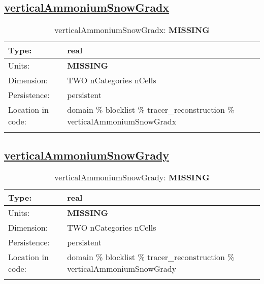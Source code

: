 \subsection[verticalAmmoniumSnowGradx]{\hyperref[sec:var_tab_tracer_reconstruction]{verticalAmmoniumSnowGradx}}
\label{subsec:var_sec_tracer_reconstruction_verticalAmmoniumSnowGradx}
\begin{center}
\begin{longtable}{| p{2.0in} | p{4.0in} |}
        \hline 
        Type: & real \\
        \hline 
        Units: & {\bf \color{red} MISSING} \\
        \hline 
        Dimension: & TWO nCategories nCells \\
        \hline 
        Persistence: & persistent \\
        \hline 
         Location in code: & domain \% blocklist \% tracer\_reconstruction \% verticalAmmoniumSnowGradx \\
         \hline 
    \caption{verticalAmmoniumSnowGradx: {\bf \color{red} MISSING}}
\end{longtable}
\end{center}
\subsection[verticalAmmoniumSnowGrady]{\hyperref[sec:var_tab_tracer_reconstruction]{verticalAmmoniumSnowGrady}}
\label{subsec:var_sec_tracer_reconstruction_verticalAmmoniumSnowGrady}
\begin{center}
\begin{longtable}{| p{2.0in} | p{4.0in} |}
        \hline 
        Type: & real \\
        \hline 
        Units: & {\bf \color{red} MISSING} \\
        \hline 
        Dimension: & TWO nCategories nCells \\
        \hline 
        Persistence: & persistent \\
        \hline 
         Location in code: & domain \% blocklist \% tracer\_reconstruction \% verticalAmmoniumSnowGrady \\
         \hline 
    \caption{verticalAmmoniumSnowGrady: {\bf \color{red} MISSING}}
\end{longtable}
\end{center}

